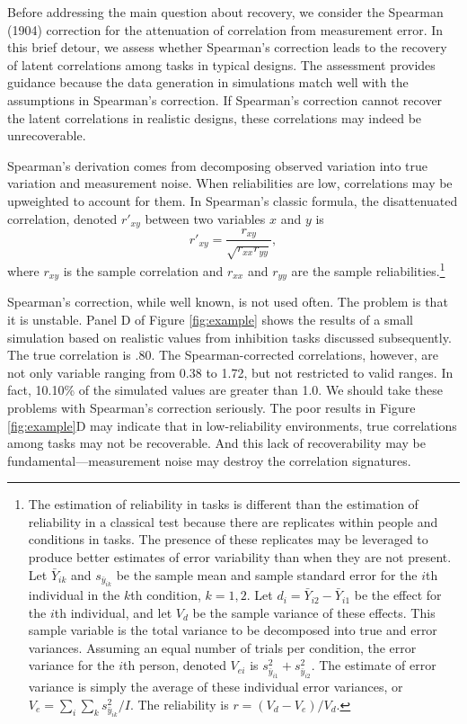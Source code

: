 \documentclass[
  english,
  ,man]{apa6}
\begin{document}
Before addressing the main question about recovery, we consider the Spearman (1904) correction for the attenuation of correlation from measurement error. In this brief detour, we assess whether Spearman's correction leads to the recovery of latent correlations among tasks in typical designs. The assessment provides guidance because the data generation in simulations match well with the assumptions in Spearman's correction. If Spearman's correction cannot recover the latent correlations in realistic designs, these correlations may indeed be unrecoverable.

Spearman's derivation comes from decomposing observed variation into true variation and measurement noise. When reliabilities are low, correlations may be upweighted to account for them. In Spearman's classic formula, the disattenuated correlation, denoted \(r'_{xy}\) between two variables \(x\) and \(y\) is
\[
r'_{xy} = \frac{r_{xy}}{\sqrt{r_{xx}r_{yy}}},
\]
where \(r_{xy}\) is the sample correlation and \(r_{xx}\) and \(r_{yy}\) are the sample reliabilities.\footnote{The estimation of reliability in tasks is different than the estimation of reliability in a classical test because there are replicates within people and conditions in tasks. The presence of these replicates may be leveraged to produce better estimates of error variability than when they are not present. Let \(\bar{Y}_{ik}\) and \(s_{\bar{y}_{ik}}\) be the sample mean and sample standard error for the \(i\)th individual in the \(k\)th condition, \(k=1,2\). Let \(d_{i}=\bar{Y}_{i2}-\bar{Y}_{i1}\) be the effect for the \(i\)th individual, and let \(V_d\) be the sample variance of these effects. This sample variable is the total variance to be decomposed into true and error variances. Assuming an equal number of trials per condition, the error variance for the \(i\)th person, denoted \(V_{ei}\) is \(s^2_{\bar{y}_{i1}}+s^2_{\bar{y}_{i2}}\). The estimate of error variance is simply the average of these individual error variances, or \(V_e=\sum_i\sum_k s_{\bar{y}_{ik}}^2/I\). The reliability is \(r=(V_d-V_e)/V_d\).}

Spearman's correction, while well known, is not used often. The problem is that it is unstable. Panel D of Figure \ref{fig:example} shows the results of a small simulation based on realistic values from inhibition tasks discussed subsequently. The true correlation is .80. The Spearman-corrected correlations, however, are not only variable ranging from 0.38 to 1.72, but not restricted to valid ranges. In fact, 10.10\% of the simulated values are greater than 1.0. We should take these problems with Spearman's correction seriously. The poor results in Figure \ref{fig:example}D may indicate that in low-reliability environments, true correlations among tasks may not be recoverable. And this lack of recoverability may be fundamental---measurement noise may destroy the correlation signatures.
\end{document}
